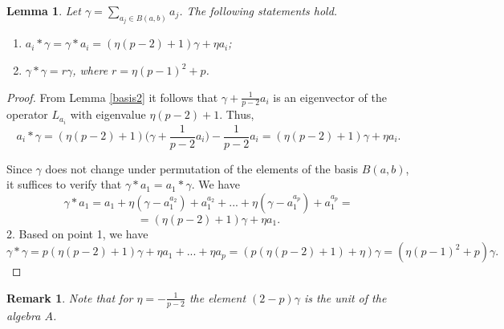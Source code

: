 \documentclass[12pt]{article}
\newcommand\gam{\gamma}
\newtheorem{lem}{Lemma}
\newtheorem{rem}{Remark}
\begin{document}
\begin{lem}\label{bemgam}
	Let $\gam=\sum_{a_j\in B(a,b)}a_j$. The following statements hold. 
	\begin{enumerate}
	\item $a_i*\gam=\gam*a_i=(\eta(p-2)+1)\gam+\eta a_i$;
	\item $\gam*\gam=r\gam$, where $r=\eta(p-1)^2+p$. 
\end{enumerate}
\end{lem}
\begin{proof}
	From Lemma \ref{basis2} it follows that $\gam+\frac{1}{p-2}a_i$ is an eigenvector of the operator $L_{a_i}$ with eigenvalue $\eta(p-2)+1$. Thus, 
    $$a_i*\gam=(\eta(p-2)+1)\Big(\gam+\frac{1}{p-2}a_i\Big)-\frac{1}{p-2}a_i=(\eta(p-2)+1)\gam+\eta a_i.$$
    
	Since $\gam$ does not change under permutation of the elements of the basis $B(a,b)$, it suffices to verify that $\gam*a_1=a_1*\gam$. We have $$\gam*a_1= a_1+\eta(\gam-a_1^{a_2})+a_1^{a_2}+...+\eta(\gam-a_1^{a_p}) +a_1^{a_p}= $$
	$$=(\eta(p-2)+1)\gam+\eta a_1.$$
	2. Based on point 1, we have $$\gam*\gam=p(\eta(p-2)+1)\gam+\eta a_1+...+\eta a_p=(p(\eta(p-2)+1)+\eta)\gam=(\eta(p-1)^2+p)\gam.$$
\end{proof}
\begin{rem}
Note that for $\eta=-\frac{1}{p-2}$ the element $(2-p)\gam$ is the unit of the algebra $A$.
\end{rem}
\end{document}
